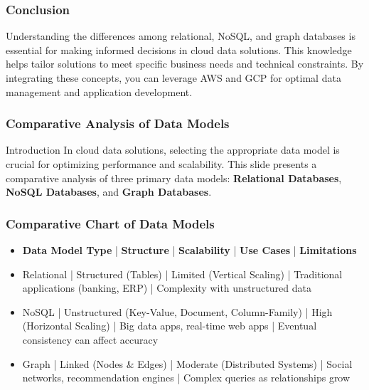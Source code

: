 \documentclass[aspectratio=169]{beamer}
\begin{document}
\begin{frame}[fragile]
    \frametitle{Conclusion}
    Understanding the differences among relational, NoSQL, and graph databases is essential for making informed decisions in cloud data solutions. This knowledge helps tailor solutions to meet specific business needs and technical constraints. By integrating these concepts, you can leverage AWS and GCP for optimal data management and application development.
\end{frame}

\begin{frame}[fragile]
    \frametitle{Comparative Analysis of Data Models}
    
    \begin{block}{Introduction}
        In cloud data solutions, selecting the appropriate data model is crucial for optimizing performance and scalability. 
        This slide presents a comparative analysis of three primary data models: \textbf{Relational Databases}, 
        \textbf{NoSQL Databases}, and \textbf{Graph Databases}.
    \end{block}
\end{frame}

\begin{frame}[fragile]
    \frametitle{Comparative Chart of Data Models}
    
    \begin{itemize}
        \item \textbf{Data Model Type} | \textbf{Structure} | \textbf{Scalability} | \textbf{Use Cases} | \textbf{Limitations}
        \item Relational | Structured (Tables) | Limited (Vertical Scaling) | Traditional applications (banking, ERP) | Complexity with unstructured data
        \item NoSQL | Unstructured (Key-Value, Document, Column-Family) | High (Horizontal Scaling) | Big data apps, real-time web apps | Eventual consistency can affect accuracy
        \item Graph | Linked (Nodes \& Edges) | Moderate (Distributed Systems) | Social networks, recommendation engines | Complex queries as relationships grow
    \end{itemize}
\end{frame}
\end{document}
